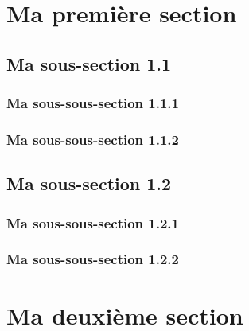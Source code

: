 \section{Ma première section} 
\lipsum[1]

\subsection{Ma sous-section 1.1}
\lipsum[1]
\subsubsection{Ma sous-sous-section 1.1.1}
\lipsum[1]
\subsubsection{Ma sous-sous-section 1.1.2}
\lipsum[1]
\subsection{Ma sous-section 1.2}
\lipsum[1]
\subsubsection{Ma sous-sous-section 1.2.1}
\lipsum[1]
\subsubsection{Ma sous-sous-section 1.2.2}
\lipsum[1]

\section{Ma deuxième section}
\lipsum[1-3]